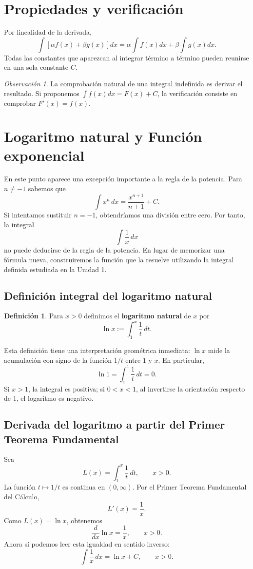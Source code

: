 \documentclass[12pt]{article}
\theoremstyle{definition}
\newtheorem{definicion}[teorema]{Definición}
\theoremstyle{remark}
\newtheorem*{observacion}{Observación}
\begin{document}
\section*{Propiedades y verificación}
Por linealidad de la derivada,
\[\int[\alpha f(x)+\beta g(x)]dx=\alpha\int f(x)dx+\beta\int g(x)dx.\]
Todas las constantes que aparezcan al integrar término a término pueden reunirse en una sola constante $C$.
\begin{observacion}La comprobación natural de una integral indefinida es derivar el resultado. Si proponemos $\int f(x)dx=F(x)+C$, la verificación consiste en comprobar $F'(x)=f(x)$.\end{observacion}
\section{Logaritmo natural y Función exponencial}
En este punto aparece una excepción importante a la regla de la potencia. Para $n\neq-1$ sabemos que
\[
\int x^n\,dx=\frac{x^{n+1}}{n+1}+C.
\]
Si intentamos sustituir $n=-1$, obtendríamos una división entre cero. Por tanto, la integral
\[
\int\frac{1}{x}\,dx
\]
no puede deducirse de la regla de la potencia. En lugar de memorizar una fórmula nueva, construiremos la función que la resuelve utilizando la integral definida estudiada en la Unidad 1.
\subsection*{Definición integral del logaritmo natural}
\begin{definicion}
Para $x>0$ definimos el \textbf{logaritmo natural} de $x$ por
\[
\boxed{\ln x:=\int_1^x\frac{1}{t}\,dt.}
\]
\end{definicion}
Esta definición tiene una interpretación geométrica inmediata: $\ln x$ mide la acumulación con signo de la función $1/t$ entre $1$ y $x$. En particular,
\[
\ln1=\int_1^1\frac{1}{t}\,dt=0.
\]
Si $x>1$, la integral es positiva; si $0<x<1$, al invertirse la orientación respecto de $1$, el logaritmo es negativo.
\subsection*{Derivada del logaritmo a partir del Primer Teorema Fundamental}
Sea
\[
L(x)=\int_1^x\frac{1}{t}\,dt,\qquad x>0.
\]
La función $t\mapsto1/t$ es continua en $(0,\infty)$. Por el Primer Teorema Fundamental del Cálculo,
\[
L'(x)=\frac1x.
\]
Como $L(x)=\ln x$, obtenemos
\[
\boxed{\frac{d}{dx}\ln x=\frac1x,\qquad x>0.}
\]
Ahora sí podemos leer esta igualdad en sentido inverso:
\[
\boxed{\int\frac1x\,dx=\ln x+C,\qquad x>0.}
\]
\end{document}
